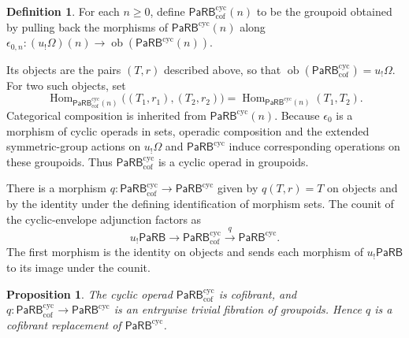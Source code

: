 \documentclass{amsart}
\newcommand{\PaRB}{\mathsf{PaRB}}
\newcommand{\magma}{\mathsf{\Omega}}
\newcommand{\Hom}{\operatorname{Hom}}
\newcommand{\ob}{\operatorname{ob}}
\newtheorem{prop}[theorem]{Proposition}%
\theoremstyle{definition}
\newtheorem{definition}[theorem]{Definition}%
\numberwithin{equation}{section}
\begin{document}
\begin{definition}
\label{def: cofibrant cyclic PaRB}
For each $n\geq0$, define
$\PaRB_{\mathrm{cof}}^{\mathrm{cyc}}(n)$ to be the groupoid obtained
by pulling back the morphisms of $\PaRB^{\mathrm{cyc}}(n)$ along
$\epsilon_{0,n}\colon(u_!\magma)(n)\to
\ob(\PaRB^{\mathrm{cyc}}(n))$.

Its objects are the pairs $(T,r)$ described above, so that
$\ob(\PaRB_{\mathrm{cof}}^{\mathrm{cyc}})=u_!\magma$. For two such
objects, set
\[
\Hom_{\PaRB_{\mathrm{cof}}^{\mathrm{cyc}}(n)}
\bigl((T_1,r_1),(T_2,r_2)\bigr)
=
\Hom_{\PaRB^{\mathrm{cyc}}(n)}(T_1,T_2).
\]
Categorical composition is inherited from
$\PaRB^{\mathrm{cyc}}(n)$. Because $\epsilon_0$ is a morphism of
cyclic operads in sets, operadic composition and the extended
symmetric-group actions on $u_!\magma$ and
$\PaRB^{\mathrm{cyc}}$ induce corresponding operations on these
groupoids. Thus $\PaRB_{\mathrm{cof}}^{\mathrm{cyc}}$ is a cyclic
operad in groupoids.
\end{definition}

There is a morphism
$q\colon\PaRB_{\mathrm{cof}}^{\mathrm{cyc}}\to
\PaRB^{\mathrm{cyc}}$ given by $q(T,r)=T$ on objects and by the
identity under the defining identification of morphism sets. The
counit of the cyclic-envelope adjunction factors as
\[
u_!\PaRB\longrightarrow
\PaRB_{\mathrm{cof}}^{\mathrm{cyc}}
\xrightarrow{\,q\,}
\PaRB^{\mathrm{cyc}}.
\]
The first morphism is the identity on objects and sends each morphism
of $u_!\PaRB$ to its image under the counit.

\begin{prop}
\label{prop: cofibrant cyclic PaRB replacement}
The cyclic operad $\PaRB_{\mathrm{cof}}^{\mathrm{cyc}}$ is
cofibrant, and
$q\colon\PaRB_{\mathrm{cof}}^{\mathrm{cyc}}\to
\PaRB^{\mathrm{cyc}}$ is an entrywise trivial fibration of
groupoids. Hence $q$ is a cofibrant replacement of
$\PaRB^{\mathrm{cyc}}$.
\end{prop}
\end{document}
